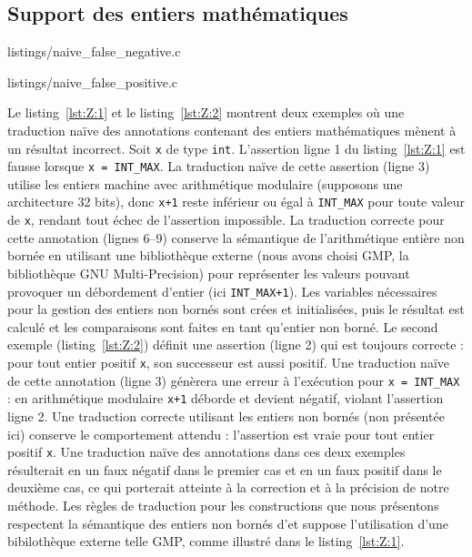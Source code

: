 \subsection{Support des entiers mathématiques}\label{sec:integers}



                {listings/naive_false_negative.c}


                {listings/naive_false_positive.c}


Le listing~\ref{lst:Z:1} et le listing~\ref{lst:Z:2} montrent deux exemples où
une traduction naïve des annotations contenant des entiers mathématiques mènent
à un résultat incorrect.
Soit \lstinline'x' de type \lstinline'int'.
L'assertion ligne 1 du listing~\ref{lst:Z:1} est fausse lorsque
\lstinline'x = INT_MAX'.
La traduction naïve de cette assertion (ligne 3) utilise les entiers machine
avec arithmétique modulaire (supposons une architecture 32 bits), donc
\lstinline'x+1' reste inférieur ou égal à \lstinline'INT_MAX' pour toute valeur
de \lstinline'x', rendant tout échec de l'assertion impossible.
La traduction correcte pour cette annotation (lignes 6--9) conserve la
sémantique de l'arithmétique entière non bornée en utilisant une bibliothèque
externe (nous avons choisi GMP, la bibliothèque GNU Multi-Precision) pour
représenter les valeurs pouvant provoquer un débordement d'entier (ici
\lstinline'INT_MAX+1').
Les variables nécessaires pour la gestion des entiers non bornés sont crées et
initialisées, puis le résultat est calculé et les comparaisons sont faites en
tant qu'entier non borné.
Le second exemple (listing~\ref{lst:Z:2}) définit une assertion \acsl (ligne 2)
qui est toujours correcte : pour tout entier positif \lstinline'x', son
successeur est aussi positif.
Une traduction naïve de cette annotation (ligne 3) génèrera une erreur à
l'exécution pour \lstinline'x = INT_MAX' : en arithmétique modulaire
\lstinline'x+1' déborde et devient négatif, violant l'assertion ligne 2.
Une traduction correcte utilisant les entiers non bornés (non présentée ici)
conserve le comportement attendu : l'assertion est vraie pour tout entier
positif \lstinline'x'.
Une traduction naïve des annotations dans ces deux exemples résulterait en un
faux négatif dans le premier cas et en un faux positif dans le deuxième cas, ce
qui porterait atteinte à la correction et à la précision de notre méthode.
Les règles de traduction pour les constructions \eacsl que nous présentons
respectent la sémantique des entiers non bornés d'\eacsl et suppose
l'utilisation d'une bibilothèque externe telle GMP, comme illustré dans le
listing~\ref{lst:Z:1}.

